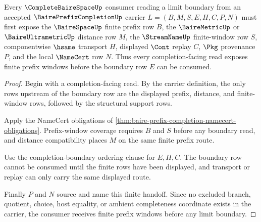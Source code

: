 \begin{theorem}\label{thm:baire-prefix-completion-finite-window-exhaustion}
Every $\CompleteBaireSpaceUp$ consumer reading a limit boundary from an accepted $\BairePrefixCompletionUp$ carrier $L=(B,M,S,E,H,C,P,N)$ must first expose the $\BaireSpaceUp$ finite prefix row $B$, the $\BaireMetricUp$ or $\BaireUltrametricUp$ distance row $M$, the $\StreamNameUp$ finite-window row $S$, componentwise $\hsame$ transport $H$, displayed $\Cont$ replay $C$, $\Pkg$ provenance $P$, and the local $\NameCert$ row $N$. Thus every completion-facing read exposes finite prefix windows before the boundary row $E$ can be consumed.
\end{theorem}
\begin{proof}
Begin with a completion-facing read. By the carrier definition, the only rows upstream of the boundary row are the displayed prefix, distance, and finite-window rows, followed by the structural support rows.

Apply the NameCert obligations of \autoref{thm:baire-prefix-completion-namecert-obligations}. Prefix-window coverage requires $B$ and $S$ before any boundary read, and distance compatibility places $M$ on the same finite prefix route.

Use the completion-boundary ordering clause for $E,H,C$. The boundary row cannot be consumed until the finite rows have been displayed, and transport or replay can only carry the same displayed route.

Finally $P$ and $N$ source and name this finite handoff. Since no excluded branch, quotient, choice, host equality, or ambient completeness coordinate exists in the carrier, the consumer receives finite prefix windows before any limit boundary.
\end{proof}



